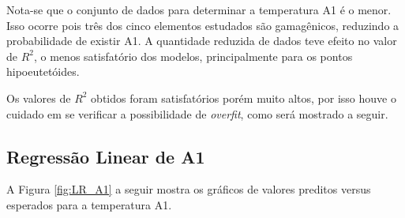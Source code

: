 \documentclass[brazil,tf,epusp]{usp}  %
\begin{document}
Nota-se que o conjunto de dados para determinar a temperatura A1 é o menor. Isso ocorre pois três dos cinco elementos estudados são gamagênicos, reduzindo a probabilidade de existir A1. A quantidade reduzida de dados teve efeito no valor de $R^{2}$, o menos satisfatório dos modelos, principalmente para os pontos hipoeutetóides.

Os valores de $R^{2}$ obtidos foram satisfatórios porém muito altos, por isso houve o cuidado em se verificar a possibilidade de \textit{overfit}, como será mostrado a seguir.

\subsection{Regressão Linear de A1}

A Figura \ref{fig:LR_A1} a seguir mostra os gráficos de valores preditos versus esperados para a temperatura A1.
\end{document}
